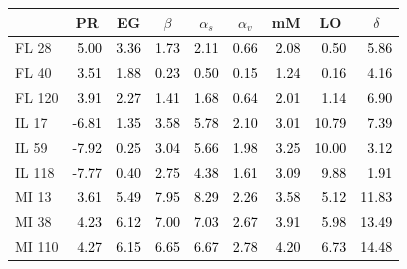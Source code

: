 \begin{tabular}{lrrrrrrrr}
\toprule
 & \multicolumn{1}{c}{PR} & \multicolumn{1}{c}{EG} & \multicolumn{1}{c}{$\beta$} & \multicolumn{1}{c}{$\alpha_s$} & \multicolumn{1}{c}{$\alpha_v$} & \multicolumn{1}{c}{mM} & \multicolumn{1}{c}{LO} & \multicolumn{1}{c}{$\delta$} \\
\midrule
FL 28 & \textcolor{black}{ 5.00 } & \textcolor{black}{ 3.36 } & \textcolor{black}{ 1.73 } & \textcolor{black}{ 2.11 } & \textcolor{black}{ 0.66 } & \textcolor{black}{ 2.08 } & \textcolor{black}{ 0.50 } & \textcolor{black}{ 5.86 } \\
FL 40 & \textcolor{black}{ 3.51 } & \textcolor{black}{ 1.88 } & \textcolor{black}{ 0.23 } & \textcolor{black}{ 0.50 } & \textcolor{black}{ 0.15 } & \textcolor{black}{ 1.24 } & \textcolor{black}{ 0.16 } & \textcolor{black}{ 4.16 } \\
FL 120 & \textcolor{black}{ 3.91 } & \textcolor{black}{ 2.27 } & \textcolor{black}{ 1.41 } & \textcolor{black}{ 1.68 } & \textcolor{black}{ 0.64 } & \textcolor{black}{ 2.01 } & \textcolor{black}{ 1.14 } & \textcolor{black}{ 6.90 } \\
IL 17 & \textcolor{black}{ -6.81 } & \textcolor{black}{ 1.35 } & \textcolor{black}{ 3.58 } & \textcolor{black}{ 5.78 } & \textcolor{black}{ 2.10 } & \textcolor{black}{ 3.01 } & \textcolor{black}{ 10.79 } & \textcolor{black}{ 7.39 } \\
IL 59 & \textcolor{black}{ -7.92 } & \textcolor{black}{ 0.25 } & \textcolor{black}{ 3.04 } & \textcolor{black}{ 5.66 } & \textcolor{black}{ 1.98 } & \textcolor{black}{ 3.25 } & \textcolor{black}{ 10.00 } & \textcolor{black}{ 3.12 } \\
IL 118 & \textcolor{black}{ -7.77 } & \textcolor{black}{ 0.40 } & \textcolor{black}{ 2.75 } & \textcolor{black}{ 4.38 } & \textcolor{black}{ 1.61 } & \textcolor{black}{ 3.09 } & \textcolor{black}{ 9.88 } & \textcolor{black}{ 1.91 } \\
MI 13 & \textcolor{black}{ 3.61 } & \textcolor{black}{ 5.49 } & \textcolor{black}{ 7.95 } & \textcolor{black}{ 8.29 } & \textcolor{black}{ 2.26 } & \textcolor{black}{ 3.58 } & \textcolor{black}{ 5.12 } & \textcolor{black}{ 11.83 } \\
MI 38 & \textcolor{black}{ 4.23 } & \textcolor{black}{ 6.12 } & \textcolor{black}{ 7.00 } & \textcolor{black}{ 7.03 } & \textcolor{black}{ 2.67 } & \textcolor{black}{ 3.91 } & \textcolor{black}{ 5.98 } & \textcolor{black}{ 13.49 } \\
MI 110 & \textcolor{black}{ 4.27 } & \textcolor{black}{ 6.15 } & \textcolor{black}{ 6.65 } & \textcolor{black}{ 6.67 } & \textcolor{black}{ 2.78 } & \textcolor{black}{ 4.20 } & \textcolor{black}{ 6.73 } & \textcolor{black}{ 14.48 } \\

\end{tabular}
